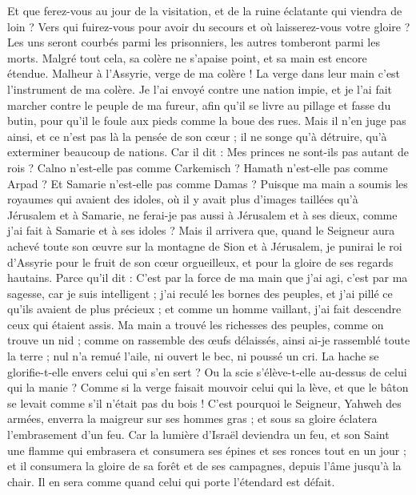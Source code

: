 \begin{multicols}{2}
Et que ferez-vous au jour de la visitation, et de la ruine éclatante qui viendra de loin ? Vers qui fuirez-vous pour avoir du secours et où laisserez-vous votre gloire ?
Les uns seront courbés parmi les prisonniers, les autres tomberont parmi les morts. Malgré tout cela, sa colère ne s'apaise point, et sa main est encore étendue.
Malheur à l'Assyrie, verge de ma colère ! La verge dans leur main c'est l'instrument de ma colère.
Je l'ai envoyé contre une nation impie, et je l'ai fait marcher contre le peuple de ma fureur, afin qu'il se livre au pillage et fasse du butin, pour qu'il le foule aux pieds comme la boue des rues.
Mais il n'en juge pas ainsi, et ce n'est pas là la pensée de son cœur ; il ne songe qu'à détruire, qu'à exterminer beaucoup de nations.
Car il dit : Mes princes ne sont-ils pas autant de rois ?
Calno n'est-elle pas comme Carkemisch ? Hamath n'est-elle pas comme Arpad ? Et Samarie n'est-elle pas comme Damas ?
Puisque ma main a soumis les royaumes qui avaient des idoles, où il y avait plus d'images taillées qu'à Jérusalem et à Samarie,
ne ferai-je pas aussi à Jérusalem et à ses dieux, comme j'ai fait à Samarie et à ses idoles ?
Mais il arrivera que, quand le Seigneur aura achevé toute son œuvre sur la montagne de Sion et à Jérusalem, je punirai le roi d'Assyrie pour le fruit de son cœur orgueilleux, et pour la gloire de ses regards hautains.
Parce qu'il dit : C'est par la force de ma main que j'ai agi, c'est par ma sagesse, car je suis intelligent ; j'ai reculé les bornes des peuples, et j'ai pillé ce qu'ils avaient de plus précieux ; et comme un homme vaillant, j'ai fait descendre ceux qui étaient assis.
Ma main a trouvé les richesses des peuples, comme on trouve un nid ; comme on rassemble des œufs délaissés, ainsi ai-je rassemblé toute la terre ; nul n'a remué l'aile, ni ouvert le bec, ni poussé un cri.
La hache se glorifie-t-elle envers celui qui s'en sert ? Ou la scie s'élève-t-elle au-dessus de celui qui la manie ? Comme si la verge faisait mouvoir celui qui la lève, et que le bâton se levait comme s'il n'était pas du bois !
C'est pourquoi le Seigneur, Yahweh des armées, enverra la maigreur sur ses hommes gras ; et sous sa gloire éclatera l'embrasement d'un feu.
Car la lumière d'Israël deviendra un feu, et son Saint une flamme qui embrasera et consumera ses épines et ses ronces tout en un jour ;
et il consumera la gloire de sa forêt et de ses campagnes, depuis l'âme jusqu'à la chair. Il en sera comme quand celui qui porte l'étendard est défait.

\end{multicols}
